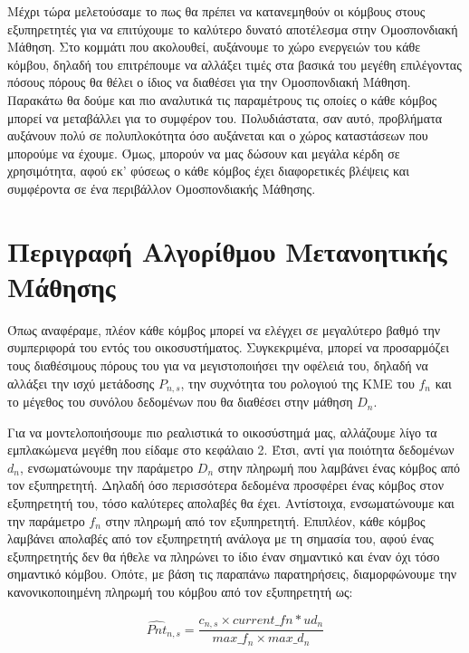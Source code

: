 Μέχρι τώρα μελετούσαμε το πως θα πρέπει να κατανεμηθούν οι κόμβους στους εξυπηρετητές για να επιτύχουμε το καλύτερο δυνατό αποτέλεσμα στην Ομοσπονδιακή Μάθηση. Στο κομμάτι που ακολουθεί, αυξάνουμε το χώρο ενεργειών του κάθε κόμβου, δηλαδή του επιτρέπουμε να αλλάξει τιμές στα βασικά του μεγέθη επιλέγοντας πόσους πόρους θα θέλει ο ίδιος να διαθέσει για την Ομοσπονδιακή Μάθηση. Παρακάτω θα δούμε και πιο αναλυτικά τις παραμέτρους τις οποίες ο κάθε κόμβος μπορεί να μεταβάλλει για το συμφέρον του. Πολυδιάστατα, σαν αυτό, προβλήματα αυξάνουν πολύ σε πολυπλοκότητα όσο αυξάνεται και ο χώρος καταστάσεων που μπορούμε να έχουμε. Όμως, μπορούν να μας δώσουν και μεγάλα κέρδη σε χρησιμότητα, αφού εκ' φύσεως ο κάθε κόμβος έχει διαφορετικές βλέψεις και συμφέροντα σε ένα περιβάλλον Ομοσπονδιακής Μάθησης.

\section{Περιγραφή Αλγορίθμου Μετανοητικής Μάθησης}

Όπως αναφέραμε, πλέον κάθε κόμβος μπορεί να ελέγχει σε μεγαλύτερο βαθμό την συμπεριφορά του εντός του οικοσυστήματος. Συγκεκριμένα, μπορεί να προσαρμόζει τους διαθέσιμους πόρους του για να μεγιστοποιήσει την οφέλειά του, δηλαδή να αλλάξει την ισχύ μετάδοσης $P_{n,s}$, την συχνότητα του ρολογιού της ΚΜΕ του $f_n$ και το μέγεθος του συνόλου δεδομένων που θα διαθέσει στην μάθηση $D_n$.

Για να μοντελοποιήσουμε πιο ρεαλιστικά το οικοσύστημά μας, αλλάζουμε λίγο τα εμπλακώμενα μεγέθη που είδαμε στο κεφάλαιο 2. Έτσι, αντί για ποιότητα δεδομένων $d_n$, ενσωματώνουμε την παράμετρο $D_n$ στην πληρωμή που λαμβάνει ένας κόμβος από τον εξυπηρετητή. Δηλαδή όσο περισσότερα δεδομένα προσφέρει ένας κόμβος στον εξυπηρετητή του, τόσο καλύτερες απολαβές θα έχει. Αντίστοιχα, ενσωματώνουμε και την παράμετρο $f_n$ στην πληρωμή από τον εξυπηρετητή. Επιπλέον, κάθε κόμβος λαμβάνει απολαβές από τον εξυπηρετητή ανάλογα με τη σημασία του, αφού ένας εξυπηρετητής δεν θα ήθελε να πληρώνει το ίδιο έναν σημαντικό και έναν όχι τόσο σημαντικό κόμβου. Οπότε, με βάση τις παραπάνω παρατηρήσεις, διαμορφώνουμε την κανονικοποιημένη πληρωμή του κόμβου από τον εξυπηρετητή ως:

\vspace{-5pt}

\begin{equation}
\hat{Pnt}_{n,s}=\frac{c_{n,s}\times current\_fn*ud_n}{max\_f_n\times max\_d_n}
\label{eq20}
\end{equation}

